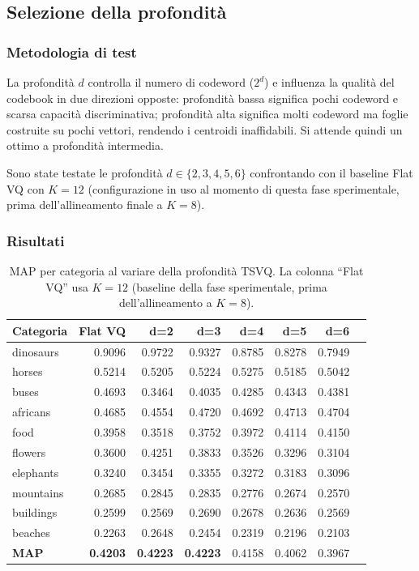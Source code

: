 \documentclass[12pt, a4paper]{article}
\begin{document}
\subsection{Selezione della profondità}
\label{subsec:depth}

\subsubsection{Metodologia di test}

La profondità $d$ controlla il numero di codeword ($2^d$) e influenza la qualità del codebook
in due direzioni opposte: profondità bassa significa pochi codeword e scarsa capacità
discriminativa; profondità alta significa molti codeword ma foglie costruite su pochi vettori,
rendendo i centroidi inaffidabili. Si attende quindi un ottimo a profondità intermedia.

Sono state testate le profondità $d \in \{2, 3, 4, 5, 6\}$ confrontando con il baseline
Flat VQ con $K=12$ (configurazione in uso al momento di questa fase sperimentale, prima
dell'allineamento finale a $K=8$).

\subsubsection{Risultati}

\begin{table}[H]
\centering
\small
\begin{tabular}{lrrrrrrr}
\toprule
\textbf{Categoria} & \textbf{Flat VQ} & \textbf{d=2} & \textbf{d=3} & \textbf{d=4}
    & \textbf{d=5} & \textbf{d=6} \\
\midrule
dinosaurs  & 0.9096 & 0.9722 & 0.9327 & 0.8785 & 0.8278 & 0.7949 \\
horses     & 0.5214 & 0.5205 & 0.5224 & 0.5275 & 0.5185 & 0.5042 \\
buses      & 0.4693 & 0.3464 & 0.4035 & 0.4285 & 0.4343 & 0.4381 \\
africans   & 0.4685 & 0.4554 & 0.4720 & 0.4692 & 0.4713 & 0.4704 \\
food       & 0.3958 & 0.3518 & 0.3752 & 0.3972 & 0.4114 & 0.4150 \\
flowers    & 0.3600 & 0.4251 & 0.3833 & 0.3526 & 0.3296 & 0.3104 \\
elephants  & 0.3240 & 0.3454 & 0.3355 & 0.3272 & 0.3183 & 0.3096 \\
mountains  & 0.2685 & 0.2845 & 0.2835 & 0.2776 & 0.2674 & 0.2570 \\
buildings  & 0.2599 & 0.2569 & 0.2690 & 0.2678 & 0.2636 & 0.2569 \\
beaches    & 0.2263 & 0.2648 & 0.2454 & 0.2319 & 0.2196 & 0.2103 \\
\midrule
\textbf{MAP} & \textbf{0.4203} & \textbf{0.4223} & \textbf{0.4223} & 0.4158 & 0.4062 & 0.3967 \\
\bottomrule
\end{tabular}
\caption{MAP per categoria al variare della profondità TSVQ. La colonna ``Flat VQ'' usa
$K=12$ (baseline della fase sperimentale, prima dell'allineamento a $K=8$).}
\label{tab:depth}
\end{table}
\end{document}
